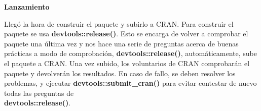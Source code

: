 \textbf{Lanzamiento}

Lleg\'o la hora de construir el paquete y subirlo a CRAN. Para construir el paquete
se usa \textbf{devtools::release()}. Esto se encarga de volver a comprobar el paquete una \'ultima
vez y nos hace una serie de preguntas acerca de buenas pr\'acticas a modo de comprobaci\'on,
\textbf{devtools::release()}, autom\'aticamente, sube el paquete a CRAN.
Una vez subido, los voluntarios de CRAN comprobar\'an el paquete y
devolver\'an los resultados.
En caso de fallo, se deben resolver los problemas, y ejecutar \textbf{devtools::submit\_cran()} para evitar contestar de nuevo todas las preguntas de \\
\textbf{devtools::release()}.

\newpage
\thispagestyle{empty}
\mbox{}
\newpage
